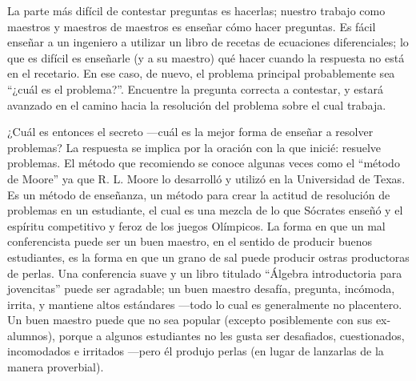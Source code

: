 \documentclass[12pt]{article}
\begin{document}
    La parte más difícil de contestar preguntas es hacerlas; nuestro trabajo como maestros y maestros de maestros
    es enseñar cómo hacer preguntas.
    Es fácil enseñar a un ingeniero a utilizar un libro de recetas de ecuaciones diferenciales; lo que es difícil es
    enseñarle (y a su maestro) qué hacer cuando la respuesta no está en el recetario.
    En ese caso, de nuevo, el problema principal probablemente sea “¿cuál es el problema?”.
    Encuentre la pregunta correcta a contestar, y estará avanzado en el camino hacia la resolución del problema
    sobre el cual trabaja.

    ¿Cuál es entonces el secreto —cuál es la mejor forma de enseñar a resolver problemas?
    La respuesta se
    implica por la oración con la que inicié: resuelve problemas.
    El método que recomiendo se conoce algunas veces como el “método de Moore” ya que R. L. Moore lo desarrolló y
    utilizó en la Universidad de Texas.
    Es un método de enseñanza, un método para crear la actitud de resolución de problemas en un estudiante, el cual
    es una mezcla de lo que Sócrates enseñó y el espíritu competitivo y feroz de los juegos Olímpicos.
    La forma en que un mal conferencista puede ser un buen maestro, en el sentido de producir buenos estudiantes, es la
    forma en que un grano de sal puede producir ostras productoras de perlas.
    Una conferencia suave y un libro titulado “Álgebra introductoria para jovencitas” puede ser agradable; un buen
    maestro desafía, pregunta, incómoda, irrita, y mantiene altos estándares —todo lo cual es generalmente no placentero.
    Un buen maestro puede que no sea popular (excepto posiblemente con sus ex-alumnos), porque a algunos
    estudiantes no les gusta ser desafiados, cuestionados, incomodados e irritados —pero él produjo perlas (en
    lugar de lanzarlas de la manera proverbial).
\end{document}
